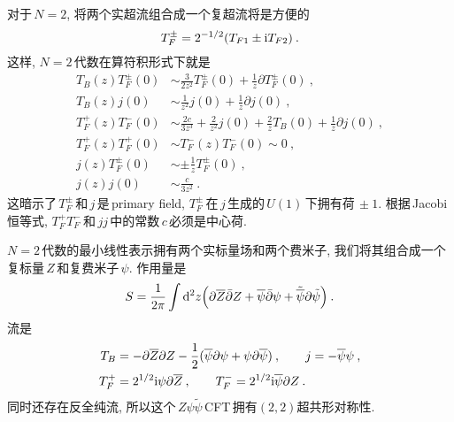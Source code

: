 对于$\,N=2$, 将两个实超流组合成一个复超流将是方便的
\begin{equation}
    T_{F}^{\pm} = 2^{-1/2}(T_{F1}\pm \mathrm{i} T_{F2}) \:. \label{11.1.3}
\end{equation}
这样, $N=2\,$代数在算符积形式下就是
\begin{subequations}
    \begin{align}
        T_{B}(z)T_{F}^{\pm}(0)&\sim \frac{3}{2z^{2}} T_{F}^{\pm}(0) + \frac{1}{z}\partial T_{F}^{\pm}(0)\:,\label{11.1.4a} \\
        T_{B}(z) j(0) &\sim \frac{1}{z^{2}} j(0) +\frac{1}{z}\partial j(0) \:, \label{11.1.4b} \\
        T_{F}^{+}(z)T_{F}^{-}(0)&\sim \frac{2c}{3z^{3}}+\frac{2}{z^{2}}j(0)+\frac{2}{z}T_{B}(0)+\frac{1}{z}\partial j(0) \:,\label{11.1.4c} \\
        T^{+}_{F}(z)T^{+}_{F}(0)& \sim T^{-}_{F}(z)T^{-}_{F}(0) \sim 0 \:, \label{11.1.4d} \\
        j(z)T_{F}^{\pm}(0) &\sim \pm \frac{1}{z} T_{F}^{\pm}(0) \:, \label{11.1.4e} \\
        j(z)j(0) &\sim \frac{c}{3z^{2}}\:. \label{11.1.4f}
    \end{align}
\end{subequations}
这暗示了$\,T_{F}^{\pm}\,$和$\,j\,$是\,primary field, $T_{F}^{\pm}\,$在$\,j\,$生成的$\,U(1)\,$下拥有荷$\,\pm1$. 根据\,Jacobi\,恒等式, $T_{F}^{+}T_{F}^{-}\,$和$\,jj\,$中的常数$\,c\,$必须是中心荷.

$N=2\,$代数的最小线性表示拥有两个实标量场和两个费米子, 我们将其组合成一个复标量$\,Z\,$和复费米子$\,\psi$. 作用量是
\begin{equation}
    S=\frac{1}{2\pi} \int \mathrm{d}^{2}z\Bigl( \partial \overline{Z}\bar{\partial}Z 
    +\overline{\psi}\bar{\partial}\psi + \tilde{\overline{\psi}}\partial\tilde{\psi}\Bigr)\:. \label{11.1.5}
\end{equation}
流是
\begin{subequations}
    \begin{align}
        T_{B} &= -\partial\overline{Z}\partial Z -\frac{1}{2}(\overline{\psi}\partial\psi+\psi\partial\overline{\psi})\:,\qquad j=-\overline{\psi}\psi \:,\label{11.1.6a} \\
        T_{F}^{+} &= 2^{1/2} \mathrm{i}\psi \partial\overline{Z} \:, \qquad 
        T_{F}^{-} = 2^{1/2} \mathrm{i}\overline{\psi} \partial Z\:. \label{11.1.6b}
    \end{align} \label{11.1.6}
\end{subequations}
同时还存在反全纯流, 所以这个$\,Z\psi\tilde{\psi}\,$CFT\,拥有$(2,2)$超共形对称性.

